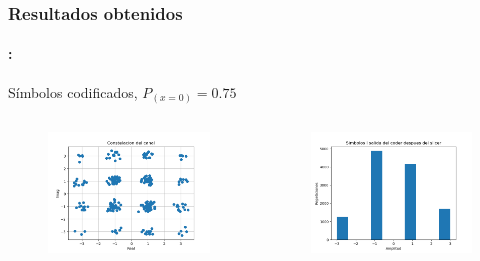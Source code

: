 \begin{frame}
  \frametitle{\textbf{Resultados obtenidos}}
   \framesubtitle{\secname : \subsecname}
   Símbolos codificados, $P_{(x=0)}=0.75$
    \vspace{-0.3cm}

\begin{columns}
    \begin{column}{0.48\linewidth}  
    \begin{figure}
        \centering
    \includegraphics[width=\textwidth]{Graficos/Channel_Constelation.png}%
    \end{figure}
    \end{column}

    \begin{column}{0.48\linewidth}
    \begin{figure}
        \centering
    \includegraphics[width=\textwidth]{Graficos/I_symbols_slicer.png}
    \end{figure}
    \end{column}
\end{columns}
\end{frame}

